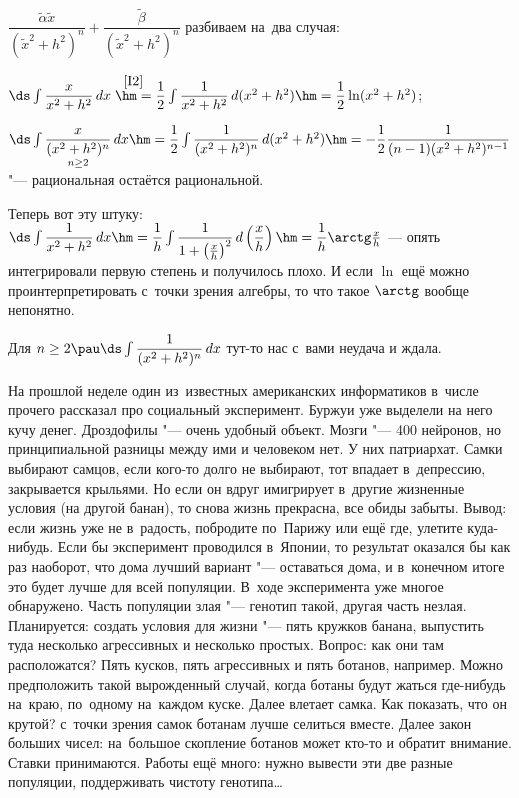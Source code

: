 \documentclass[a4paper,10pt,twoside]{article}
\begin{document}
$\dfrac{\tilde\alpha\tilde x}{(\tilde x^2+h^2)^n}+\dfrac{\tilde\beta}{(\tilde x^2+h^2)^n}$ разбиваем на~два случая:

$\ds\int\dfrac{x}{x^2+h^2}\,dx\overset{\ref{I2}}{\hm=}\dfrac12\int\dfrac{1}{x^2+h^2}\,d(x^2+h^2)\hm=\dfrac12\ln(x^2+h^2)$;

$\ds\int\underset{n\geq2}{\dfrac{x}{(x^2+h^2)^n}}\,dx\hm=\dfrac12\int\dfrac1{(x^2+h^2)^n}\,d(x^2+h^2)\hm=-\dfrac12\dfrac{1}{(n-1)(x^2+h^2)^{n-1}}$ "--- рациональная остаётся рациональной.

Теперь вот эту штуку: $\ds\int\dfrac1{x^2+h^2}\,dx\hm=\dfrac1h\int\dfrac1{1+\left(\frac{x}{h}\right)^2}\,d\left(\dfrac{x}{h}\right)\hm=\dfrac1h\arctg \frac xh$
--- опять интегрировали первую степень и получилось плохо. И если $\ln$ ещё можно проинтерпретировать с~точки зрения алгебры, то что такое $\arctg$ вообще непонятно.

Для $n\geq2\pau \ds\int\dfrac{1}{(x^2+h^2)^n}\,dx$ тут-то нас с~вами неудача и ждала.

На прошлой неделе один из~известных американских информатиков в~числе прочего рассказал про социальный эксперимент. Буржуи уже выделели на
него кучу денег. Дроздофилы "--- очень удобный объект. Мозги "--- 400 нейронов, но принципиальной разницы между ими и человеком нет. У них патриархат.
Самки выбирают самцов, если кого-то долго не выбирают, тот впадает в~депрессию, закрывается крыльями. Но если он вдруг имигрирует в~другие жизненные
условия (на другой банан), то снова жизнь прекрасна, все обиды забыты. Вывод: если жизнь уже не в~радость, побродите по~Парижу или ещё где, улетите куда-нибудь.
Если бы эксперимент проводился в~Японии, то результат оказался бы как раз наоборот, что дома лучший вариант "--- оставаться дома, и в~конечном итоге
это будет лучше для всей популяции. В~ходе эксперимента уже многое обнаружено. Часть популяции злая "--- генотип такой, другая часть незлая.
Планируется: создать условия для жизни "--- пять кружков банана, выпустить туда несколько агрессивных и несколько простых. Вопрос: как они там расположатся?
Пять кусков, пять агрессивных и пять ботанов, например. Можно предположить такой вырожденный случай, когда ботаны будут жаться где-нибудь на~краю, 
 по~одному на~каждом куске. Далее влетает самка. Как показать, что он крутой? с~точки зрения самок ботанам лучше селиться вместе. Далее закон
 больших чисел: на~большое скопление ботанов может кто-то и обратит внимание. Ставки принимаются. Работы ещё много: нужно вывести эти две разные популяции, поддерживать чистоту генотипа\ldots
 
\end{document}
